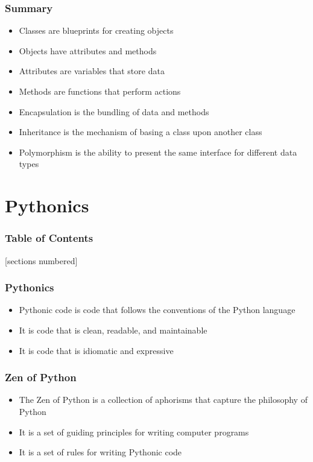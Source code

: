 \documentclass[serif, 9pt, aspectratio=32]{beamer}
\begin{document}
\begin{frame}
    \centering
    \frametitle{Summary}
    \begin{itemize}
        \setlength{\itemsep}{2em}
        \item Classes are blueprints for creating objects
        \item Objects have attributes and methods
        \item Attributes are variables that store data
        \item Methods are functions that perform actions
        \item Encapsulation is the bundling of data and methods
        \item Inheritance is the mechanism of basing a class upon another class
        \item Polymorphism is the ability to present the same interface for different data types
    \end{itemize}
\end{frame}

\section{Pythonics}

\begin{frame}
    \frametitle{Table of Contents}
    [sections numbered]
    \tableofcontents[currentsection]
\end{frame}

\begin{frame}
    \centering
    \frametitle{Pythonics}
    \begin{itemize}
        \setlength{\itemsep}{2em}
        \item Pythonic code is code that follows the conventions of the Python language
        \item It is code that is clean, readable, and maintainable
        \item It is code that is idiomatic and expressive
    \end{itemize}
\end{frame}

\begin{frame}
    \centering
    \frametitle{Zen of Python}
    \begin{itemize}
        \setlength{\itemsep}{2em}
        \item The Zen of Python is a collection of aphorisms that capture the philosophy of Python
        \item It is a set of guiding principles for writing computer programs
        \item It is a set of rules for writing Pythonic code
    \end{itemize}
\end{frame}
\end{document}
